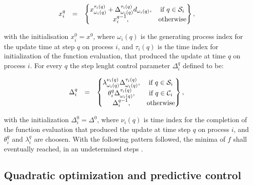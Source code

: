 	\begin{equation}
        \begin{array}{rcl}
            x_i^q&=&\begin{Bmatrix}
                x_{\omega_i(q)}^{\tau_i(q)}+\Delta_{\omega_i(q)}^{\tau_i(q)}d_{\omega_i(q)},&\textnormal{if }q\in\mathcal{S}_i\\
                x_i^{q-1},&\textnormal{otherwise}\\
            \end{Bmatrix},\\
        \end{array}
        \label{BSIC:equ:APPS_x}
    \end{equation}
		
		with the initialisation $x^0_i=x^0$, where $\omega_i(q)$ is the generating process index for the update time at step $q$ on process $i$, and $\tau_i(q)$ is the time index for initialization of the function evaluation, that produced the update at time $q$ on process $i$. For every $q$ the step lenght control parameter $\Delta_i^q$ defined to be:
		
		\begin{equation}
        \begin{array}{rcl}
            \Delta_i^q&=&\begin{Bmatrix}
                \lambda_{\omega_i(q)}^{\nu_i(q)}\Delta_{\omega_i(q)}^{\tau_i(q)},&\textnormal{if }q\in\mathcal{S}_i\\
								\theta_{i}^{q}\Delta_{\omega_i(q)}^{\tau_i(q)},&\textnormal{if }q\in\mathcal{C}_i\\
                \Delta_i^{q-1},&\textnormal{otherwise}\\
            \end{Bmatrix},\\
        \end{array}
        \label{BSIC:equ:APPS_Delta}
    \end{equation}
		
		with the initialization $\Delta^0_i=\Delta^0$, where $\nu_i(q)$ is  time index for the completion of the function evaluation that produced the update at time step $q$ on process $i$, and $\theta_i^q$ and $\lambda_i^q$ are choosen. With the following pattern followed, the minima of $f$ shall eventually reached, in an undetermined steps \cite{kolda2003understanding}.

\subsection{Quadratic optimization and predictive control}\label{BASICCSR:sec:MPC}

